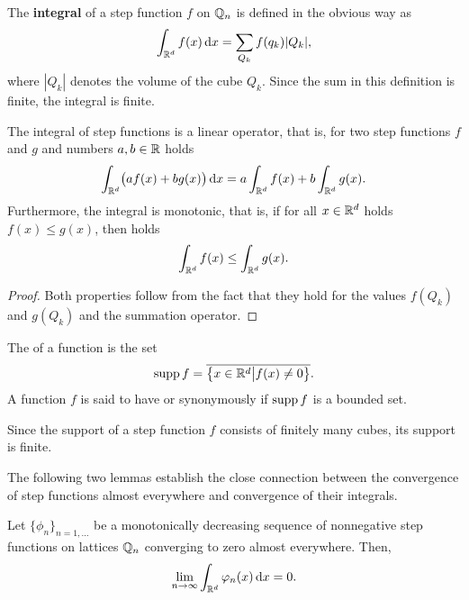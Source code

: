 \begin{definition}
  The \textbf{integral} of a step function $f$ on $\mathbb Q_n$ is
  defined in the obvious way as
  \begin{gather*}
    \int_{\mathbb R^d} f(x) \,\mathrm{d} x = \sum_{Q_k} f(q_k) |Q_k|,
  \end{gather*}
  where $|Q_k|$ denotes the volume of the cube $Q_k$. Since the sum in
  this definition is finite, the integral is finite.
\end{definition}

\begin{lemma}
  The integral of step functions is a linear operator,
  that is, for two step functions $f$ and $g$ and numbers $a,b\in
  \mathbb R$ holds
  \begin{gather*}
    \int_{\mathbb R^d}\bigl(a f(x)+b g(x)\bigr) \,\mathrm{d} x
    = a\int_{\mathbb R^d} f(x) + b \int_{\mathbb R^d} g(x).
  \end{gather*}
  Furthermore, the integral is monotonic, that is, if for all $x\in
  \mathbb R^d$ holds $f(x) \le g(x)$, then holds
  \begin{gather*}
    \int_{\mathbb R^d} f(x) \le \int_{\mathbb R^d} g(x).
  \end{gather*}
\end{lemma}

\begin{proof}
  Both properties follow from the fact that they hold for the values
  $f(Q_k)$ and $g(Q_k)$ and the summation operator.
\end{proof}

\begin{definition}
  The  of a function is the set
  \begin{gather}
    \operatorname{supp} f = \overline{
      \bigl\{x\in \mathbb R^d\big| f(x) \neq 0 \bigr\}}.
  \end{gather}
  A function $f$ is said to have  or
  synonymously  if $\operatorname{supp} f$ is a bounded set.
\end{definition}

\begin{note}
  Since the support of a step function $f$ consists of finitely many
  cubes, its support is finite.
\end{note}

The following two lemmas establish the close connection between the
convergence of step functions almost everywhere and convergence of
their integrals.

\begin{lemma}
  \label{lemma:integral:1}
  Let $\{\phi_n\}_{n=1,\dots}$ be a monotonically decreasing sequence
  of nonnegative step functions on lattices $\mathbb Q_n$ converging to zero almost
  everywhere. Then,
  \begin{gather*}
    \lim_{n\to \infty}\int_{\mathbb R^d} \varphi_n(x) \,\mathrm{d} x = 0.
  \end{gather*}
\end{lemma}

